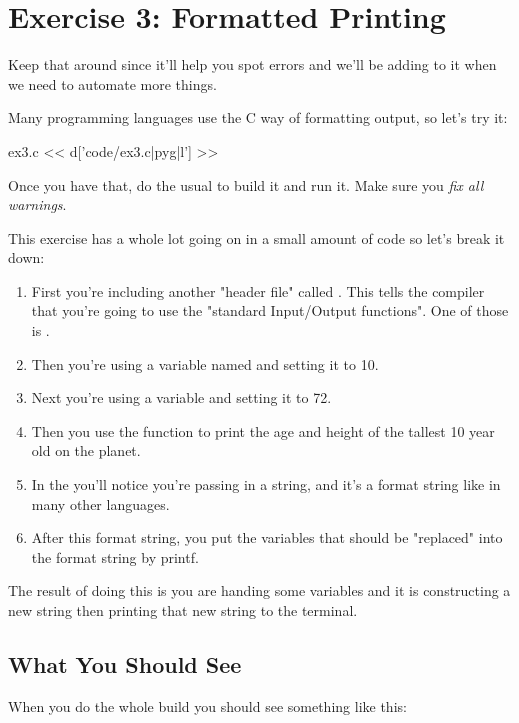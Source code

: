 \chapter{Exercise 3: Formatted Printing}

Keep that  around since it'll help you spot errors
and we'll be adding to it when we need to automate more things.

Many programming languages use the C way of formatting output, so let's try it:

\begin{code}{ex3.c}
<< d['code/ex3.c|pyg|l'] >>
\end{code}

Once you have that, do the usual  to build it and run it. 
Make sure you \emph{fix all warnings}.

This exercise has a whole lot going on in a small amount of code so 
let's break it down:

\begin{enumerate}
\item First you're including another "header file" called . This tells the compiler that you're going to use the "standard Input/Output functions".  One of those is .
\item Then you're using a variable named  and setting it to 10.
\item Next you're using a variable  and setting it to 72.
\item Then you use the  function to print the age and height
     of the tallest 10 year old on the planet.
\item In the  you'll notice you're passing in a string, and
    it's a format string like in many other languages.
\item After this format string, you put the variables that should be 
    "replaced" into the format string by printf.
\end{enumerate}

The result of doing this is you are handing  some variables
and it is constructing a new string then printing that new string to the
terminal.

\section{What You Should See}

When you do the whole build you should see something like this:

